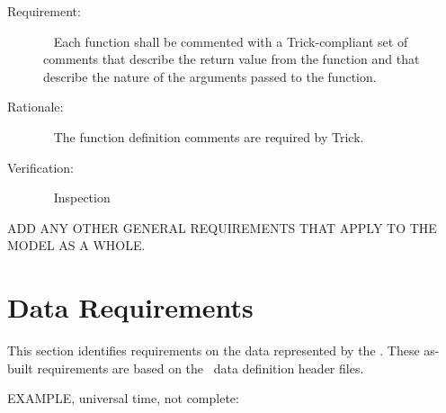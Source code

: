 \documentclass[twoside,11pt,titlepage]{report}
\begin{document}
\label{reqt:func_trick_comments}
\begin{description}
  \item[Requirement:]\ \newline
    Each function shall be commented with a Trick-compliant
    set of comments that describe the return value from the
    function and that describe the nature of the arguments
    passed to the function.

  \item[Rationale:]\ \newline
    The function definition comments are required by Trick.

  \item[Verification:]\ \newline
    Inspection
\end{description}


ADD ANY OTHER GENERAL REQUIREMENTS THAT APPLY TO THE
MODEL AS A WHOLE.


\section{Data Requirements}\label{sec:data_reqts}

This section identifies requirements on the data
represented by the \MODEL. These as-built requirements are
based on the \MODEL\ data definition header files.

EXAMPLE, universal time, not complete:
\end{document}
